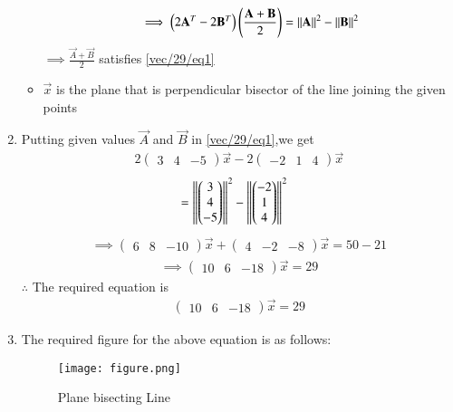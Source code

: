 \documentclass[journal,12pt,twocolumn]{IEEEtran}
\newcommand{\myvec}[1]{\ensuremath{\begin{pmatrix}#1\end{pmatrix}}}
\begin{document}
\begin{enumerate}
\begin{itemize}
\begin{align}
\implies\myvec{2\vec{A}^T-2\vec{B}^T}\brak{\frac{\vec{A}+\vec{B}}{2}}=\norm{\vec{A}}^2-\norm{\vec{B}}^2 
\end{align}
$\implies \frac{\vec{A}+\vec{B}}{2}$ satisfies \eqref{vec/29/eq1}\\
\item $\vec{x}$ is the plane that is perpendicular bisector of the line joining the given points \\
\end{itemize}
\item Putting given values $\vec{A}$ and $\vec{B}$ in \eqref{vec/29/eq1},we get 
\begin{align}
2\myvec{3 & 4 & -5}\vec{x}-2\myvec{-2 & 1 & 4}\vec{x}
\end{align}
\begin{align}
    & = \norm{\myvec{3\\4\\-5}}^2 - \norm{\myvec{-2\\1\\4}}^2
\end{align}
\begin{align}
 \implies\myvec{6 & 8 & -10}\vec{x}+\myvec{4 & -2 & -8}\vec{x} =50-21   
\end{align}
\begin{align}
\implies\myvec{10 & 6 & -18}\vec{x}=29
\end{align}
$\therefore$ The required equation is
\begin{align}
\myvec{10 & 6 & -18}\vec{x}=29
\end{align}

\item The required figure for the above equation is as follows:
\begin{figure}[!ht]
    \centering
    \texttt{[image: figure.png]}
    \caption{Plane bisecting Line}
    \label{quadform/73/b/fig:Plane bisecting Line}
\end{figure} 
\end{enumerate}
\end{document}
